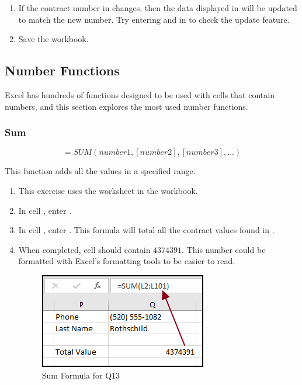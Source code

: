 \begin{enumbox}
\begin{enumerate}
		\item If the contract number in  changes, then the data displayed in  will be updated to match the new number. Try entering  and  in  to check the update feature.
		\item Save the  workbook.
			
	\end{enumerate}
\end{enumbox}
	
\subsection{Number Functions}

Excel has hundreds of functions designed to be used with cells that contain numbers, and this section explores the most used number functions.

\subsubsection{Sum}

\[ =SUM(number1, [number2], [number3], ...) \]

This function adds all the values in a specified range. 

\begin{enumbox}
	\begin{enumerate}
		\item This exercise uses the  worksheet in the  workbook.
		\item In cell , enter .
		\item In cell , enter . This formula will total all the contract values found in .
		\item When completed, cell  should contain $ 4374391 $. This number could be formatted with Excel's formatting tools to be easier to read.
	
		\begin{figure}[H]
			\centering
			\includegraphics[width=\maxwidth{.75\linewidth}]{gfx/ch09_fig38}
			\caption{Sum Formula for Q13}
			\label{09:fig38}
		\end{figure}
		
	\end{enumerate}
\end{enumbox}
	
